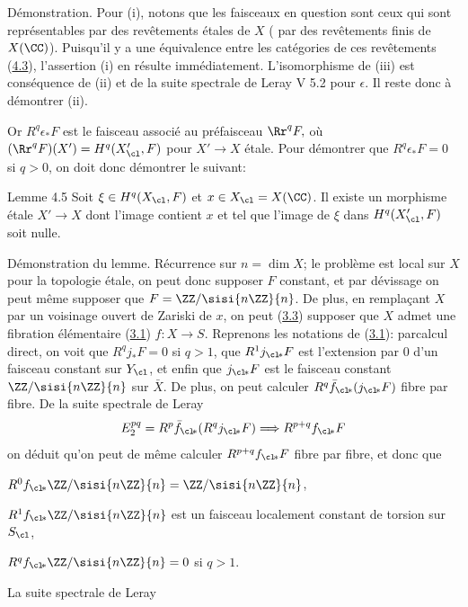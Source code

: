 \documentclass[10pt]{../fichiers-configuration-latex/smfart}
\begin{document}
Démonstration. Pour (i), notons que les faisceaux en question sont
ceux qui sont représentables par des revêtements étales de $X$ (\resp
par des revêtements finis de $X(\CC)$). Puisqu'il y a une
équivalence entre les catégories de ces revêtements
(\hyperref[XI.thm4.3]{4.3}), l'assertion 
(i) en résulte immédiatement. L'isomorphisme de (iii) est conséquence
de (ii) et de la suite spectrale de Leray V 5.2 %
pour $\epsilon$. Il
reste donc à démontrer (ii).

Or $R^q\epsilon_{\ast}F$ est le faisceau associé au préfaisceau
$\Rr^qF,$ où $(\Rr^qF)(X')=H^q(X'_{\cl},F)$ pour
$X'\rightarrow X$ étale. Pour démontrer que $R^q\epsilon_{\ast}F=0$ si
$q>0$, on doit donc démontrer le  suivant:

\begin{enonce*}{Lemme 4.5}
Soit $\xi\in H^q(X_{\cl},F)$ et $x\in X_{\cl}=X(\CC)$. Il
existe un morphisme étale $X'\rightarrow X$ dont l'image contient $x$
et tel que l'image de $\xi$ dans $H^q(X'_{\cl},F)$ soit nulle.
\end{enonce*}

Démonstration du lemme. Récurrence sur $n=\dim X$; le problème est
local sur $X$ pour la topologie étale,  on peut donc supposer $F$
constant, et par dévissage on peut même supposer que
$F=\ZZ/\sisi{n\ZZ}{n}$. De plus, en remplaçant $X$ par un voisinage
ouvert de Zariski de $x$, on peut (\hyperref[XI.prop3.3]{3.3}) supposer que $X$ admet une
fibration élémentaire (\hyperref[XI.def3.1]{3.1}) $f:X\rightarrow S$. Reprenons les
notations de (\hyperref[XI.def3.1]{3.1}): par\pageoriginale calcul direct, on voit que
$R^q{j}_{\ast}F=0$ si $q>1$, que $R^1j_{\cl\!\ast}F$ est
l'extension par $0$ d'un faisceau constant sur $Y_{\cl}$, et enfin que
$j_{\cl\!\ast}F$ est le faisceau constant $\ZZ/\sisi{n\ZZ}{n}$ sur
$\bar{X}$. De plus, on peut calculer $R^q
\bar{f}_{\cl\!\ast}(j_{\cl\!\ast}F)$ fibre par fibre. De la suite
spectrale de Leray
$$
E^{pq}_2=R^p\bar{f}_{\cl\!\ast}(R^qj_{\cl\!\ast}F)\Longrightarrow
R^{p+q}f_{\cl\!\ast}F
$$
on déduit qu'on peut de même calculer $R^{p+q}f_{\cl\!\ast}F$ fibre
par fibre, et donc que 

$R^0f_{\cl\!\ast}\ZZ/\sisi{n\ZZ}{n}=\ZZ/\sisi{n\ZZ}{n}$,

$R^1f_{\cl\!\ast}\ZZ/\sisi{n\ZZ}{n}$ est un faisceau localement constant de
  torsion sur $S_{\cl}$,

$R^qf_{\cl\!\ast}\ZZ/\sisi{n\ZZ}{n}=0$ si $q>1$.

La suite spectrale de Leray
\end{document}
